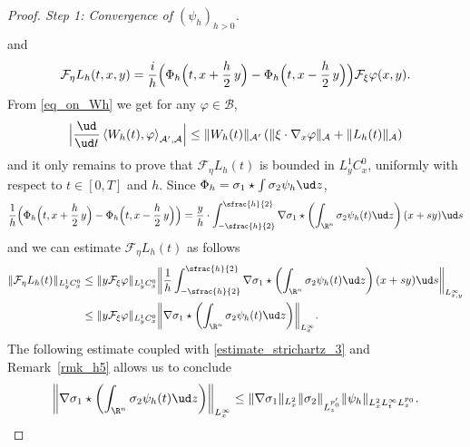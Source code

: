 \begin{proof}[Proof. Step 1: Convergence of $(\psi_{h})_{h>0}$]
\begin{align*}
\end{align*}
and
\[
\mathcal{F}_{\eta}L_{h}(t,x,y)=\frac{i}{h}\Bigl(\Phi_{h}\Bigl(t,x+\frac{h}{2}\,y\Bigr)-\Phi_{h}\Bigl(t,x-\frac{h}{2}\,y\Bigr)\Bigr)\mathcal{F}_{\xi}\varphi(x,y).
\]
From \eqref{eq_on_Wh} we get for any $\varphi\in\mathcal{B}$,
\[
\Bigl|\frac{\ud}{\ud t}\left\langle W_{h}(t),\varphi\right\rangle_{\mathcal{A}',\mathcal{A}}\Bigr|\leq\|W_{h}(t)\|_{\mathcal{A}'}\left(\|\xi\cdot\nabla_{x}\varphi\|_{\mathcal{A}}+\|L_{h}(t)\|_{\mathcal{A}}\right)
\]
and it only remains to prove that $\mathcal{F}_{\eta}L_{h}(t)$ is bounded in $L_{y}^{1}C_{x}^{0}$, uniformly with respect to $t\in[0,T]$ and $h$. Since $\Phi_{h}=\sigma_{1}\star\int\sigma_{2}\psi_{h}\ud z$,
\[
\frac{1}{h}\Bigl(\Phi_{h}\Bigl(t,x+\frac{h}{2}\,y\Bigr)-\Phi_{h}\Bigl(t,x-\frac{h}{2}\,y\Bigr)\Bigr)=\frac{y}{h}\cdot\int_{-\sfrac{h}{2}}^{\sfrac{h}{2}}\nabla\sigma_{1}\star\left(\int_{\R^{n}}\sigma_{2}\psi_{h}(t)\ud z\right)(x+sy)\ud s
\]
and we can estimate $\mathcal{F}_{\eta}L_{h}(t)$ as follows
\begin{align*}
\|\mathcal{F}_{\eta}L_{h}(t)\|_{L_{y}^{1}C_{x}^{0}}&\leq\|y\mathcal{F}_{\xi}\varphi\|_{L_{y}^{1}C_{x}^{0}}\biggl\|\frac{1}{h}\int_{-\sfrac{h}{2}}^{\sfrac{h}{2}}\nabla\sigma_{1}\star\left(\int_{\R^{n}}\sigma_{2}\psi_{h}(t)\ud z\right)(x+sy)\ud s\biggr\|_{L_{x,y}^{\infty}}\\
&\leq\|y\mathcal{F}_{\xi}\varphi\|_{L_{y}^{1}C_{x}^{0}}\biggl\|\nabla\sigma_{1}\star\left(\int_{\R^{n}}\sigma_{2}\psi_{h}(t)\ud z\right)\biggr\|_{L_{x}^{\infty}}.
\end{align*}
The following estimate coupled with \eqref{estimate_strichartz_3} and Remark~\ref{rmk_h5} allows us to conclude
\[
\left\|\nabla\sigma_{1}\star\left(\int_{\R^{n}}\sigma_{2}\psi_{h}(t)\ud z\right)\right\|_{L_{x}^{\infty}}\leq\|\nabla\sigma_{1}\|_{L_{x}^{2}}\|\sigma_{2}\|_{L_{z}^{p_{0}'}}\|\psi_{h}\|_{L_{x}^{2}L_{t}^{\infty}L_{z}^{p_{0}}}.
\]


\end{proof}

